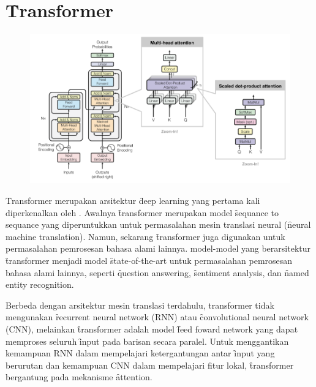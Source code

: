 \section{\f{Transformer}}
	\begin{figure}[!ht]
		\centering
		\includegraphics[width=1\textwidth]{assets/pics/lilianweng-transformer.png}
		\label{fig:transformer}
	\end{figure}
	\f{Transformer} merupakan arsitektur \f{deep learning} yang pertama kali diperkenalkan oleh \cite{transformerori}. Awalnya \f{transformer}  merupakan model \f{sequance to sequance} yang diperuntukkan untuk permasalahan mesin translasi neural (\f{neural machine translation}). Namun, sekarang \f{transformer} juga digunakan untuk permasalahan pemrosesan bahasa alami lainnya. model-model yang berarsitektur \f{transformer} menjadi model \f{state-of-the-art} untuk permasalahan pemrosesan bahasa alami lainnya, seperti \f{question answering}, \f{sentiment analysis}, dan \f{named entity recognition}.
 
	Berbeda dengan arsitektur mesin translasi terdahulu, transformer tidak mengunakan \f{recurrent neural network} (RNN) atau \f{convolutional neural network} (CNN), melainkan \f{transformer} adalah model \f{feed foward network} yang dapat memproses seluruh \f{input} pada barisan secara paralel. Untuk menggantikan kemampuan RNN dalam mempelajari ketergantungan antar \f{input} yang berurutan dan kemampuan CNN dalam mempelajari fitur lokal, \f{transformer} bergantung pada mekanisme \f{attention}.

